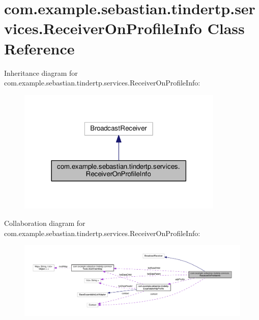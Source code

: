 \hypertarget{classcom_1_1example_1_1sebastian_1_1tindertp_1_1services_1_1ReceiverOnProfileInfo}{}\section{com.\+example.\+sebastian.\+tindertp.\+services.\+Receiver\+On\+Profile\+Info Class Reference}
\label{classcom_1_1example_1_1sebastian_1_1tindertp_1_1services_1_1ReceiverOnProfileInfo}


Inheritance diagram for com.\+example.\+sebastian.\+tindertp.\+services.\+Receiver\+On\+Profile\+Info\+:\nopagebreak
\begin{figure}[H]
\begin{center}
\leavevmode
\includegraphics[width=278pt]{classcom_1_1example_1_1sebastian_1_1tindertp_1_1services_1_1ReceiverOnProfileInfo__inherit__graph}
\end{center}
\end{figure}


Collaboration diagram for com.\+example.\+sebastian.\+tindertp.\+services.\+Receiver\+On\+Profile\+Info\+:\nopagebreak
\begin{figure}[H]
\begin{center}
\leavevmode
\includegraphics[width=350pt]{classcom_1_1example_1_1sebastian_1_1tindertp_1_1services_1_1ReceiverOnProfileInfo__coll__graph}
\end{center}
\end{figure}
